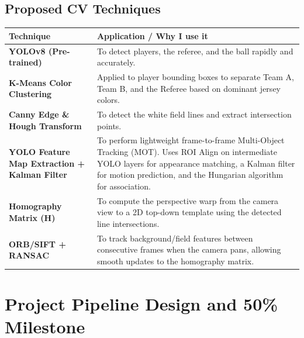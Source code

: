 \documentclass[11pt]{article}
\begin{document}
\subsection{Proposed CV Techniques}
\vspace{0.2cm}
\noindent
\begin{tabularx}{\textwidth}{@{} >{\raggedright\arraybackslash}p{4cm} X @{}}
\toprule
\textbf{Technique} & \textbf{Application / Why I use it} \\
\midrule
\textbf{YOLOv8 (Pre-trained)} & To detect players, the referee, and the ball rapidly and accurately. \\
\addlinespace
\textbf{K-Means Color Clustering} & Applied to player bounding boxes to separate Team A, Team B, and the Referee based on dominant jersey colors. \\
\addlinespace
\textbf{Canny Edge \& Hough Transform} & To detect the white field lines and extract intersection points. \\
\addlinespace
\textbf{YOLO Feature Map Extraction + Kalman Filter} & To perform lightweight frame-to-frame Multi-Object Tracking (MOT). Uses ROI Align on intermediate YOLO layers for appearance matching, a Kalman filter for motion prediction, and the Hungarian algorithm for association. \\
\addlinespace
\textbf{Homography Matrix (H)} & To compute the perspective warp from the camera view to a 2D top-down template using the detected line intersections. \\
\addlinespace
\textbf{ORB/SIFT + RANSAC} & To track background/field features between consecutive frames when the camera pans, allowing smooth updates to the homography matrix. \\
\bottomrule
\end{tabularx}

\section{Project Pipeline Design and 50\% Milestone}
\end{document}
